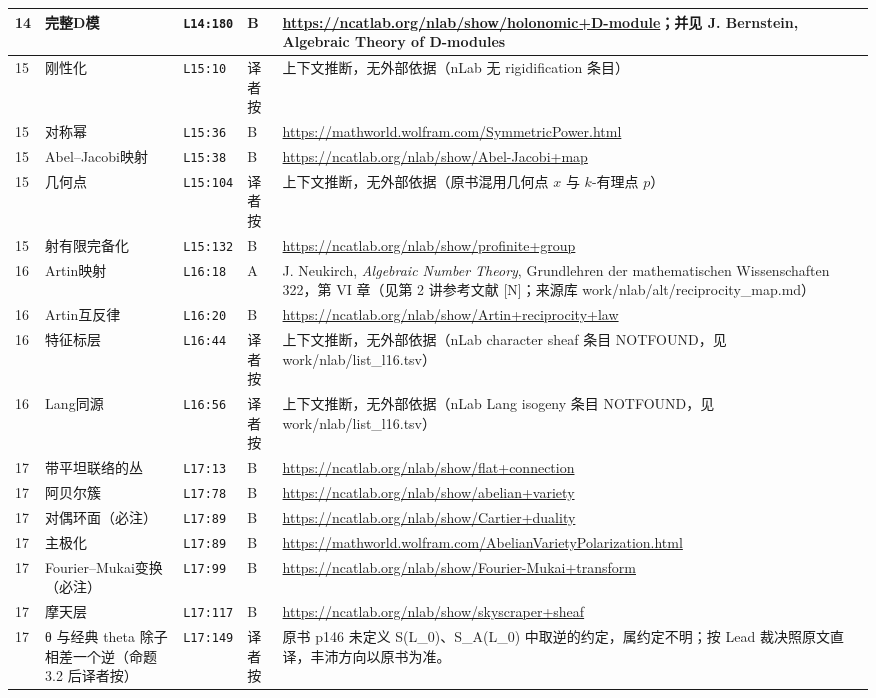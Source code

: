 \begin{longtable}{@{}p{1.0cm}p{3.3cm}p{1.5cm}p{1.3cm}p{7.9cm}@{}}
14 & 完整D模 & \texttt{L14:180} & B & \url{https://ncatlab.org/nlab/show/holonomic+D-module}；并见 J. Bernstein, Algebraic Theory of D-modules \\
\midrule
15 & 刚性化 & \texttt{L15:10} & 译者按 & 上下文推断，无外部依据（nLab 无 rigidification 条目） \\
15 & 对称幂 & \texttt{L15:36} & B & \url{https://mathworld.wolfram.com/SymmetricPower.html} \\
15 & Abel–Jacobi映射 & \texttt{L15:38} & B & \url{https://ncatlab.org/nlab/show/Abel-Jacobi+map} \\
15 & 几何点 & \texttt{L15:104} & 译者按 & 上下文推断，无外部依据（原书混用几何点 $x$ 与 $k$-有理点 $p$） \\
15 & 射有限完备化 & \texttt{L15:132} & B & \url{https://ncatlab.org/nlab/show/profinite+group} \\
\midrule
16 & Artin映射 & \texttt{L16:18} & A & J. Neukirch, \textit{Algebraic Number Theory}, Grundlehren der mathematischen Wissenschaften 322，第 VI 章（见第 2 讲参考文献 [N]；来源库 work/nlab/alt/reciprocity\_map.md） \\
16 & Artin互反律 & \texttt{L16:20} & B & \url{https://ncatlab.org/nlab/show/Artin+reciprocity+law} \\
16 & 特征标层 & \texttt{L16:44} & 译者按 & 上下文推断，无外部依据（nLab character sheaf 条目 NOTFOUND，见 work/nlab/list\_l16.tsv） \\
16 & Lang同源 & \texttt{L16:56} & 译者按 & 上下文推断，无外部依据（nLab Lang isogeny 条目 NOTFOUND，见 work/nlab/list\_l16.tsv） \\
\midrule
17 & 带平坦联络的丛 & \texttt{L17:13} & B & \url{https://ncatlab.org/nlab/show/flat+connection} \\
17 & 阿贝尔簇 & \texttt{L17:78} & B & \url{https://ncatlab.org/nlab/show/abelian+variety} \\
17 & 对偶环面（必注） & \texttt{L17:89} & B & \url{https://ncatlab.org/nlab/show/Cartier+duality} \\
17 & 主极化 & \texttt{L17:89} & B & \url{https://mathworld.wolfram.com/AbelianVarietyPolarization.html} \\
17 & Fourier–Mukai变换（必注） & \texttt{L17:99} & B & \url{https://ncatlab.org/nlab/show/Fourier-Mukai+transform} \\
17 & 摩天层 & \texttt{L17:117} & B & \url{https://ncatlab.org/nlab/show/skyscraper+sheaf} \\
17 & θ 与经典 theta 除子相差一个逆（命题 3.2 后译者按） & \texttt{L17:149} & 译者按 & 原书 p146 未定义 S(L\_0)、S\_A(L\_0) 中取逆的约定，属约定不明；按 Lead 裁决照原文直译，丰沛方向以原书为准。 \\

\end{longtable}

